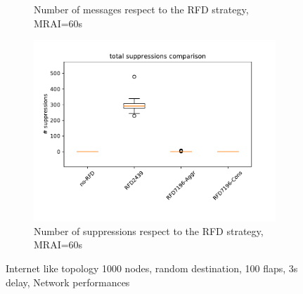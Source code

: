 \begin{figure}[H]
\begin{subfigure}[b]{0.325\textwidth}
         \caption{Number of messages respect to the RFD strategy, MRAI=60s}
         \label{fig:1000_RFD_MRAI30_messages_mice}
     \end{subfigure}
     \hfill
     \begin{subfigure}[b]{0.325\textwidth}
         \centering
         \includegraphics[width=\textwidth]{images/RFD/miceVSelephants/MultiMRAI/60/mice/cisco_1000MRAI60_rfd_comparison_suppressions_boxplot.pdf}
         \caption{Number of suppressions respect to the RFD strategy, MRAI=60s}
         \label{fig:1000_RFD_MRAI30_suppressions_mice}
     \end{subfigure}
        \caption{Internet like topology 1000 nodes, random destination, 100 flaps, 3s delay, Network performances}
        \label{fig:1000_RFD_MRAI30_mice}
\end{figure}

